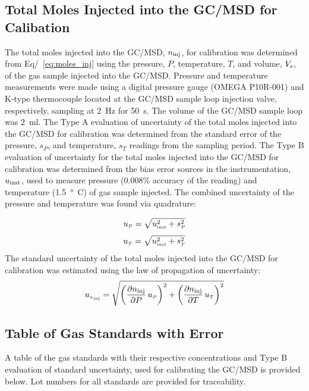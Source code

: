 \documentclass[12pt]{article}
\begin{document}
\subsection{Total Moles Injected into the GC/MSD for Calibation}
\label{ssec:Total Moles Injected into the GC/MSD for Calibation}

The total moles injected into the GC/MSD, $ n_{\rm inj}$, for calibration was determined from Eq/~\ref{eq:moles_inj} using the pressure, $P$, temperature, $T$, and volume, $V_{\rm s}$, of the gas sample injected into the GC/MSD. Pressure and temperature measurements were made using a digital pressure gauge (OMEGA P10R-001) and K-type thermocouple located at the GC/MSD sample loop injection valve, respectively, sampling at \SI{2}{Hz} for \SI{50}{s}. The volume of the GC/MSD sample loop was \SI{2}{ml}. The Type A evaluation of uncertainty of the total moles injected into the GC/MSD for calibration was determined from the standard error of the pressure, $s_{P}$, and temperature, $s_{T}$ readings from the sampling period. The Type B evaluation of uncertainty for the total moles injected into the GC/MSD for calibration was determined from the bias error sources in the instrumentation, $u_{\rm inst}$, used to measure pressure (0.008\% accuracy of the reading) and temperature (\SI{1.5}{\degree C}) of gas sample injected. The combined uncertainty of the pressure and temperature was found via quadrature:

\begin{equation}
\label{eq:pressure_uncertainty}
u_{\scriptscriptstyle P} = \sqrt{ u_{\rm \scriptscriptstyle inst}^2 + s_{\scriptscriptstyle P}^2}
\end{equation}
\begin{equation}
\label{eq:temp_uncertainty}
u_{\scriptscriptstyle T} = \sqrt{ u_{\rm \scriptscriptstyle inst}^2 + s_{\scriptscriptstyle T}^2}
\end{equation}
The standard uncertainty of the total moles injected into the GC/MSD for calibration was estimated using the law of propagation of uncertainty:
\begin{equation}
\label{eq:moles_injected_uncertainty}
u_{\scriptscriptstyle n_{\rm inj}} = \sqrt{{\left( \frac{\partial n_{\rm inj}}{\partial P}\,u_{\scriptscriptstyle P} \right) }^2+{\left(\frac{\partial n_{\rm inj}}{\partial T}\,u_{\scriptscriptstyle T}\right)}^2}
\end{equation}

\pagebreak
\subsection{Table of Gas Standards with Error}
\label{sssec:Table of Gas Standards with Error}
A table of the gas standards with their respective concentrations and Type B evaluation of standard uncertainty, used for calibrating the GC/MSD is provided below. Lot numbers for all standards are provided for traceability.
\end{document}
